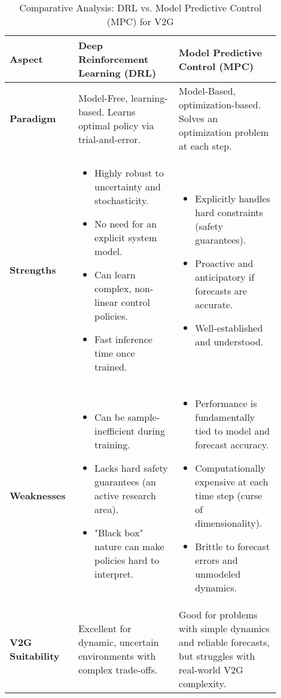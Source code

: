 \begin{table}[h!]
\centering
\caption{Comparative Analysis: DRL vs. Model Predictive Control (MPC) for V2G}
\label{tab:drl_vs_mpc}
\begin{tabular}{|p{0.2\linewidth}|p{0.35\linewidth}|p{0.35\linewidth}|}
\hline
\textbf{Aspect} & \textbf{Deep Reinforcement Learning (DRL)} & \textbf{Model Predictive Control (MPC)} \\ \hline
\textbf{Paradigm} & Model-Free, learning-based. Learns optimal policy via trial-and-error. & Model-Based, optimization-based. Solves an optimization problem at each step. \\ \hline
\textbf{Strengths} & \begin{itemize} \item Highly robust to uncertainty and stochasticity. \item No need for an explicit system model. \item Can learn complex, non-linear control policies. \item Fast inference time once trained. \end{itemize} & \begin{itemize} \item Explicitly handles hard constraints (safety guarantees). \item Proactive and anticipatory if forecasts are accurate. \item Well-established and understood. \end{itemize} \\ \hline
\textbf{Weaknesses} & \begin{itemize} \item Can be sample-inefficient during training. \item Lacks hard safety guarantees (an active research area). \item "Black box" nature can make policies hard to interpret. \end{itemize} & \begin{itemize} \item Performance is fundamentally tied to model and forecast accuracy. \item Computationally expensive at each time step (curse of dimensionality). \item Brittle to forecast errors and unmodeled dynamics. \end{itemize} \\ \hline
\textbf{V2G Suitability} & Excellent for dynamic, uncertain environments with complex trade-offs. & Good for problems with simple dynamics and reliable forecasts, but struggles with real-world V2G complexity. \\ \hline
\end{tabular}
\end{table}
